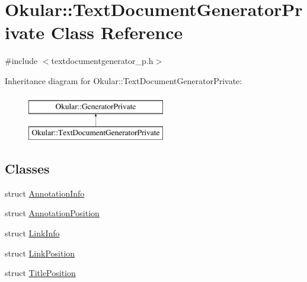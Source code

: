 \hypertarget{classOkular_1_1TextDocumentGeneratorPrivate}{\section{Okular\+:\+:Text\+Document\+Generator\+Private Class Reference}
\label{classOkular_1_1TextDocumentGeneratorPrivate}
}


{\ttfamily \#include $<$textdocumentgenerator\+\_\+p.\+h$>$}

Inheritance diagram for Okular\+:\+:Text\+Document\+Generator\+Private\+:\begin{figure}[H]
\begin{center}
\leavevmode
\includegraphics[height=2.000000cm]{classOkular_1_1TextDocumentGeneratorPrivate}
\end{center}
\end{figure}
\subsection*{Classes}
\begin{DoxyCompactItemize}
\item 
struct \hyperlink{structOkular_1_1TextDocumentGeneratorPrivate_1_1AnnotationInfo}{Annotation\+Info}
\item 
struct \hyperlink{structOkular_1_1TextDocumentGeneratorPrivate_1_1AnnotationPosition}{Annotation\+Position}
\item 
struct \hyperlink{structOkular_1_1TextDocumentGeneratorPrivate_1_1LinkInfo}{Link\+Info}
\item 
struct \hyperlink{structOkular_1_1TextDocumentGeneratorPrivate_1_1LinkPosition}{Link\+Position}
\item 
struct \hyperlink{structOkular_1_1TextDocumentGeneratorPrivate_1_1TitlePosition}{Title\+Position}
\end{DoxyCompactItemize}
